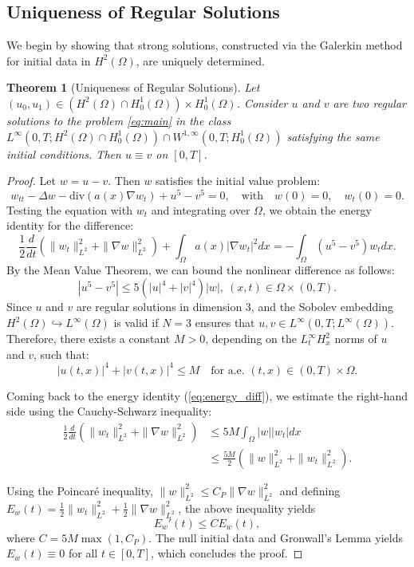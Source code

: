 \documentclass[11pt,letterpaper]{amsart}
\newtheorem{theorem}{Theorem}[section]
\begin{document}
\subsection{Uniqueness of Regular Solutions}

We begin by showing that strong solutions, constructed via the Galerkin method for initial data in $H^2(\Omega)$, are uniquely determined.

\begin{theorem}[Uniqueness of Regular Solutions]
Let $(u_0, u_1) \in (H^2(\Omega) \cap H_0^1(\Omega)) \times H_0^1(\Omega)$. Consider $u$ and $v$ are two regular solutions to the problem \eqref{eq:main} in the class $L^\infty(0,T; H^2(\Omega) \cap H_0^1(\Omega)) \cap W^{1,\infty}(0,T; H_0^1(\Omega))$ satisfying the same initial conditions. Then $u \equiv v$ on $[0,T]$.
\end{theorem}
\begin{proof}
Let $w = u - v$. Then $w$ satisfies the initial value problem:
\begin{equation}\label{eq:diff_w}
w_{tt} - \Delta w - \text{div}(a(x)\nabla w_t) + u^5 - v^5 = 0, \quad \text{with} \quad w(0) = 0, \quad w_t(0) = 0.
\end{equation}
Testing the equation with $w_t$  and integrating over $\Omega$, we obtain the energy identity for the difference:
\begin{equation}\label{eq:energy_diff}
\frac{1}{2}\frac{d}{dt} \left( \|w_t\|_{L^2}^2 + \|\nabla w\|_{L^2}^2 \right) + \int_\Omega a(x) |\nabla w_t|^2 dx = -\int_\Omega (u^5 - v^5) w_t dx.
\end{equation}
By the Mean Value Theorem, we can bound the nonlinear difference as follows:
$$
|u^5 - v^5| \le 5 \left( |u|^4 + |v|^4 \right) |w|, ~(x,t)\in \Omega \times (0,T).
$$
Since $u$ and $v$ are regular solutions in dimension 3, and the Sobolev embedding $H^2(\Omega) \hookrightarrow L^\infty(\Omega)$ is valid if $N=3$ ensures that $u, v \in L^\infty(0,T; L^\infty(\Omega))$. Therefore, there exists a constant $M > 0$, depending on the $L^\infty_t H^2_x$ norms of $u$ and $v$, such that:
$$
|u(t,x)|^4 + |v(t,x)|^4 \le M \quad \text{for a.e. } (t,x) \in (0,T) \times \Omega.
$$

Coming back to the energy identity (\ref{eq:energy_diff}), we estimate the right-hand side using the Cauchy-Schwarz inequality:
\begin{align*}
\frac{1}{2}\frac{d}{dt} \left( \|w_t\|_{L^2}^2 + \|\nabla w\|_{L^2}^2 \right) &\le 5 M \int_\Omega |w| |w_t| dx \\
&\le \frac{5 M}{2} \left( \|w\|_{L^2}^2 + \|w_t\|_{L^2}^2 \right).
\end{align*}

Using the Poincaré inequality, $\|w\|_{L^2}^2 \le C_P \|\nabla w\|_{L^2}^2$ and defining $E_w(t) = \frac{1}{2}\|w_t\|_{L^2}^2 + \frac{1}{2}\|\nabla w\|_{L^2}^2$, the above inequality yields
$$
E_w'(t) \le C E_w(t),
$$
where $C = 5M \max(1, C_P)$. The null initial data and Gronwall's Lemma yields $E_w(t) \equiv 0$ for all $t \in [0,T]$, which concludes the proof.
\end{proof}
\end{document}
